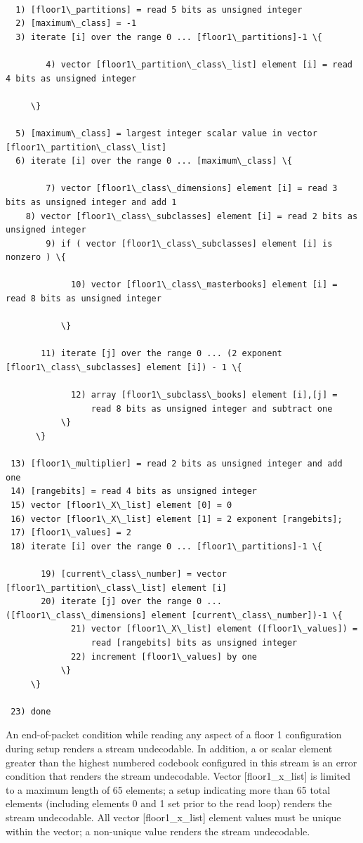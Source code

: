 \begin{Verbatim}[commandchars=\\\{\}]

  1) [floor1\_partitions] = read 5 bits as unsigned integer
  2) [maximum\_class] = -1
  3) iterate [i] over the range 0 ... [floor1\_partitions]-1 \{

        4) vector [floor1\_partition\_class\_list] element [i] = read 4 bits as unsigned integer

     \}

  5) [maximum\_class] = largest integer scalar value in vector [floor1\_partition\_class\_list]
  6) iterate [i] over the range 0 ... [maximum\_class] \{

        7) vector [floor1\_class\_dimensions] element [i] = read 3 bits as unsigned integer and add 1
	8) vector [floor1\_class\_subclasses] element [i] = read 2 bits as unsigned integer
        9) if ( vector [floor1\_class\_subclasses] element [i] is nonzero ) \{

             10) vector [floor1\_class\_masterbooks] element [i] = read 8 bits as unsigned integer

           \}

       11) iterate [j] over the range 0 ... (2 exponent [floor1\_class\_subclasses] element [i]) - 1 \{

             12) array [floor1\_subclass\_books] element [i],[j] =
                 read 8 bits as unsigned integer and subtract one
           \}
      \}

 13) [floor1\_multiplier] = read 2 bits as unsigned integer and add one
 14) [rangebits] = read 4 bits as unsigned integer
 15) vector [floor1\_X\_list] element [0] = 0
 16) vector [floor1\_X\_list] element [1] = 2 exponent [rangebits];
 17) [floor1\_values] = 2
 18) iterate [i] over the range 0 ... [floor1\_partitions]-1 \{

       19) [current\_class\_number] = vector [floor1\_partition\_class\_list] element [i]
       20) iterate [j] over the range 0 ... ([floor1\_class\_dimensions] element [current\_class\_number])-1 \{
             21) vector [floor1\_X\_list] element ([floor1\_values]) =
                 read [rangebits] bits as unsigned integer
             22) increment [floor1\_values] by one
           \}
     \}

 23) done
\end{Verbatim}

An end-of-packet condition while reading any aspect of a floor 1
configuration during setup renders a stream undecodable.  In addition,
a  or
 scalar element greater than the
highest numbered codebook configured in this stream is an error
condition that renders the stream undecodable.  Vector
[floor1\_x\_list] is limited to a maximum length of 65 elements; a
setup indicating more than 65 total elements (including elements 0 and
1 set prior to the read loop) renders the stream undecodable.  All
vector [floor1\_x\_list] element values must be unique within the
vector; a non-unique value renders the stream undecodable.

